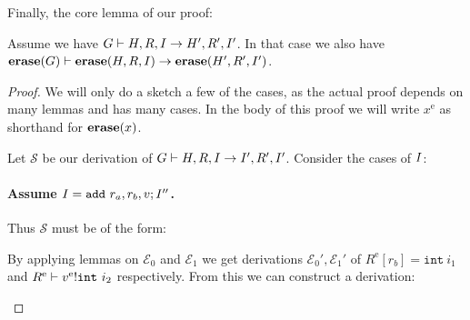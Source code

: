 Finally, the core lemma of our proof:

\begin{lemma}
  \label{lemma:erasestep}
  Assume we have
  $\execis{\high G}{\high H, \high R, \high I}{\high H', \high R', \high
    I'}$. In that case we also have
  $\execis{\erase(\high G)}{\erase(\high H, \high R, \high I)}{\erase(\high H',
    \high R', \high I')}$.
\end{lemma}
\begin{proof}
  We will only do a sketch a few of the cases, as the actual proof depends on
  many lemmas and has many cases. In the body of this proof we will write
  $x^{\mathrm{e}}$ as shorthand for $\erase(x)$.

  Let $\mathcal{S}$ be our derivation of
  $\execis{\high G}{\high H, \high R, \high I}{\high I', \high R', \high
    I'}$. Consider the cases of $\high I$:

  \paragraph{Assume $\high I = \mathtt{add}\ r_a, r_b, \high v ; \high I''$.}
  Thus $\mathcal{S}$ must be of the form:

  \begin{mathpar}
  \end{mathpar}

  By applying lemmas on $\mathcal{E}_0$ and $\mathcal{E}_1$ we get derivations
  $\mathcal{E}_0', \mathcal{E}_1'$ of $R^{\mathrm{e}}[r_b] = \mathtt{int}\ i_1$ and
  $\evalregs{\high R^{\mathrm{e}}}{\high v^{\mathrm{e}}}{\mathtt{int}\ i_2}$ respectively. From this
  we can construct a derivation:

  \begin{mathpar}
  \end{mathpar}


\end{proof}
